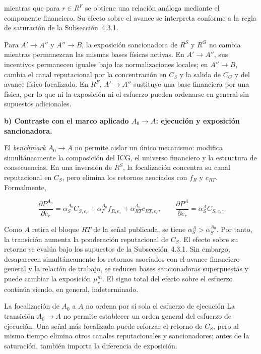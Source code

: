 mientras que para \(r\in R^{F}\) se obtiene una relación análoga mediante el componente financiero. Su efecto sobre el avance se interpreta conforme a la regla de saturación de la Subsección~4.3.1.

Para \(A'\to A''\) y \(A''\to B\), la exposición sancionadora de \(R^{S}\) y \(R^{G}\) no cambia mientras permanezcan las mismas bases físicas activas. En \(A'\to A''\), sus incentivos permanecen iguales bajo las normalizaciones locales; en \(A''\to B\), cambia el canal reputacional por la concentración en \(C_S\) y la salida de \(C_G\) y del avance físico focalizado. En \(R^{F}\), \(A'\to A''\) sustituye una base financiera por una física, por lo que ni la exposición ni el esfuerzo pueden ordenarse en general sin supuestos adicionales.

\medskip
\noindent\textbf{b) Contraste con el marco aplicado \(A_0\to A\): ejecución y exposición sancionadora.}
\par\smallskip

El \textit{benchmark} \(A_0\to A\) no permite aislar un único mecanismo: modifica simultáneamente la composición del ICG, el universo financiero y la estructura de consecuencias. En una inversión de \(R^{S}\), la focalización concentra su canal reputacional en \(C_S\), pero elimina los retornos asociados con \(f_R\) y \(c_{RT}\). Formalmente,

\begin{equation}
\label{eq:derivadas_icg_a0_a_rs}
\frac{\partial P^{A_0}}{\partial e_r}
=\alpha_S^{A_0}C_{S,e_r}+\alpha_F^{A_0}f_{R,e_r}+\alpha_{RT}^{A_0}c_{RT,e_r},
\qquad
\frac{\partial P^{A}}{\partial e_r}=\alpha_S^{A}C_{S,e_r}.
\end{equation}

Como \(A\) retira el bloque \(RT\) de la señal publicada, se tiene \(\alpha_S^{A}>\alpha_S^{A_0}\). Por tanto, la transición aumenta la ponderación reputacional de \(C_S\). El efecto sobre su retorno se evalúa bajo los supuestos de la Subsección~4.3.1. Sin embargo, desaparecen simultáneamente los retornos asociados con el avance financiero general y la relación de trabajo, se reducen bases sancionadoras superpuestas y puede cambiar la exposición \(\mu_r^m\). El signo total del efecto sobre el esfuerzo continúa siendo, en general, indeterminado.

\begin{resultadobox}
{La focalización de \(A_0\) a \(A\) no ordena por sí sola el esfuerzo de ejecución}
\label{res:benchmark_a0_a}
La transición \(A_0\to A\) no permite establecer un orden general del esfuerzo de ejecución. Una señal más focalizada puede reforzar el retorno de \(C_S\), pero al mismo tiempo elimina otros canales reputacionales y sancionadores; antes de la saturación, también importa la diferencia de exposición.
\end{resultadobox}


